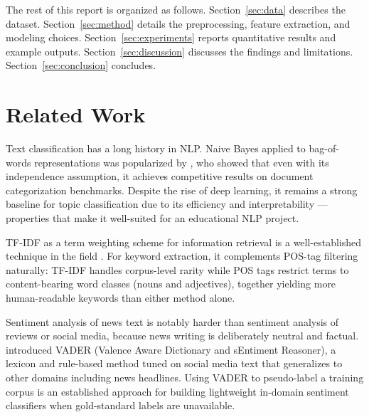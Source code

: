 The rest of this report is organized as follows. Section~\ref{sec:data} describes the dataset. Section~\ref{sec:method} details the preprocessing, feature extraction, and modeling choices. Section~\ref{sec:experiments} reports quantitative results and example outputs. Section~\ref{sec:discussion} discusses the findings and limitations. Section~\ref{sec:conclusion} concludes.

\section{Related Work}
\label{sec:related}

Text classification has a long history in NLP. Naive Bayes applied to bag-of-words representations was popularized by \citet{mccallum1998comparison}, who showed that even with its independence assumption, it achieves competitive results on document categorization benchmarks. Despite the rise of deep learning, it remains a strong baseline for topic classification due to its efficiency and interpretability — properties that make it well-suited for an educational NLP project.

TF-IDF as a term weighting scheme for information retrieval is a well-established technique in the field \cite{bird2009natural}. For keyword extraction, it complements POS-tag filtering naturally: TF-IDF handles corpus-level rarity while POS tags restrict terms to content-bearing word classes (nouns and adjectives), together yielding more human-readable keywords than either method alone.

Sentiment analysis of news text is notably harder than sentiment analysis of reviews or social media, because news writing is deliberately neutral and factual. \citet{hutto2014vader} introduced VADER (Valence Aware Dictionary and sEntiment Reasoner), a lexicon and rule-based method tuned on social media text that generalizes to other domains including news headlines. Using VADER to pseudo-label a training corpus is an established approach for building lightweight in-domain sentiment classifiers when gold-standard labels are unavailable.
